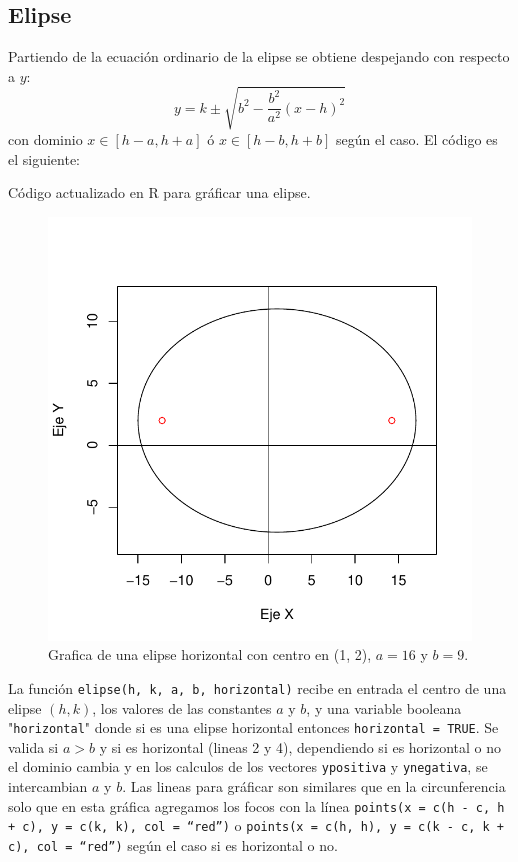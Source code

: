 \documentclass[12pt,a4paper]{article} %
\begin{document}
\newpage
\subsection{Elipse}

Partiendo de la ecuación ordinario de la elipse se obtiene despejando con respecto a $y$:
\begin{equation}
y = k \pm \sqrt{b^2 - \frac{b^2}{a^2}(x - h)^2} \label{eq:elipse}
\end{equation}
con dominio $x \in [h - a, h + a]$ ó $x \in [h - b, h + b]$ según el caso. El código es el siguiente:

\begin{table}[htpb]
	
	\caption{Código actualizado en R para gráficar una elipse.}
	\label{alg:elipse}
\end{table}

\begin{figure}
\centering
\includegraphics[scale=0.8]{elipse}
\caption{Grafica de una elipse horizontal con centro en (1, 2), $a = 16$ y $b = 9$.}
\label{fig:elipse}
\end{figure}

La función \texttt{elipse(h, k, a, b, horizontal)} recibe en entrada el centro de una elipse $(h, k)$, los valores de las constantes $a$ y $b$, y una variable booleana "\texttt{horizontal}" donde si es una elipse horizontal entonces \texttt{horizontal = TRUE}. Se valida si $a > b$ y si es horizontal (lineas 2 y 4), dependiendo si es horizontal o no el dominio cambia y en los calculos de los vectores \texttt{ypositiva} y \texttt{ynegativa}, se intercambian $a$ y $b$. Las lineas para gráficar son similares que en la circunferencia solo que en esta gráfica agregamos los focos con la línea \texttt{points(x = c(h - c, h + c), y = c(k, k), col = ``red'')} o \texttt{points(x = c(h, h), y = c(k - c, k + c), col = ``red'')} según el caso si es horizontal o no.
\end{document}
